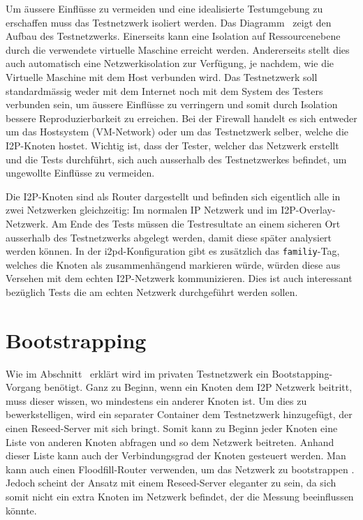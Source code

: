 Um äussere Einflüsse zu vermeiden und eine idealisierte Testumgebung zu erschaffen muss das Testnetzwerk isoliert werden.
Das Diagramm~ zeigt den Aufbau des Testnetzwerks.
Einerseits kann eine Isolation auf Ressourcenebene durch die verwendete virtuelle Maschine erreicht werden.
Andererseits stellt dies auch automatisch eine Netzwerkisolation zur Verfügung, je nachdem, wie die Virtuelle Maschine mit dem Host verbunden wird.
Das Testnetzwerk soll standardmässig weder mit dem Internet noch mit dem System des Testers verbunden sein, um äussere Einflüsse zu verringern und somit durch Isolation bessere Reproduzierbarkeit zu erreichen.
Bei der Firewall handelt es sich entweder um das Hostsystem (VM-Network) oder um das Testnetzwerk selber, welche die I2P-Knoten hostet.
Wichtig ist, dass der Tester, welcher das Netzwerk erstellt und die Tests durchführt, sich auch ausserhalb des Testnetzwerkes befindet, um ungewollte Einflüsse zu vermeiden.

Die I2P-Knoten sind als Router dargestellt und befinden sich eigentlich alle in zwei Netzwerken gleichzeitig: Im normalen IP Netzwerk und im I2P-Overlay-Netzwerk.
Am Ende des Tests müssen die Testresultate an einem sicheren Ort ausserhalb des Testnetzwerks abgelegt werden, damit diese später analysiert werden können.
In der i2pd-Konfiguration gibt es zusätzlich das \lstinline|familiy|-Tag, welches die Knoten als zusammenhängend markieren würde, würden diese aus Versehen mit dem echten I2P-Netzwerk kommunizieren. Dies ist auch interessant bezüglich Tests die am echten Netzwerk durchgeführt werden sollen.



\section{Bootstrapping}

Wie im Abschnitt~ erklärt wird im privaten Testnetzwerk ein Bootstapping-Vorgang benötigt.
Ganz zu Beginn, wenn ein Knoten dem I2P Netzwerk beitritt, muss dieser wissen, wo mindestens ein anderer Knoten ist.
Um dies zu bewerkstelligen, wird ein separater Container dem Testnetzwerk hinzugefügt, der einen Reseed-Server mit sich bringt.
Somit kann zu Beginn jeder Knoten eine Liste von anderen Knoten abfragen und so dem Netzwerk beitreten.
Anhand dieser Liste kann auch der Verbindungsgrad der Knoten gesteuert werden.
Man kann auch einen Floodfill-Router verwenden, um das Netzwerk zu bootstrappen \parencite{noauthor_bootstrapping_nodate}.
Jedoch scheint der Ansatz mit einem Reseed-Server eleganter zu sein, da sich somit nicht ein extra Knoten im Netzwerk befindet, der die Messung beeinflussen könnte.


